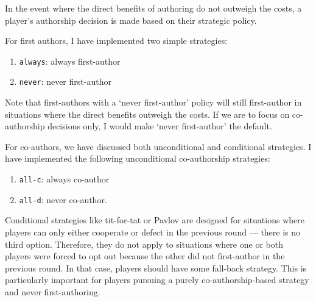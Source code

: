 \documentclass[12pt]{article}
\begin{document}
In the event where the direct benefits of authoring do not outweigh the costs,
a player's authorship decision is made based on their strategic policy.

For first authors, 
I have implemented two simple strategies:
\begin{enumerate}
    \item {\tt always}: always first-author
    \item {\tt never}: never first-author
\end{enumerate}
Note that first-authors with a `never first-author' policy will 
still first-author in situations where the direct benefits outweigh the costs.
If we are to focus on co-authorship decisions only,
I would make `never first-author' the default.

For co-authors,
we have discussed both unconditional and conditional strategies.
I have implemented the following unconditional co-authorship strategies:
\begin{enumerate}
    \item {\tt all-c}: always co-author
    \item {\tt all-d}: never co-author.
\end{enumerate}

Conditional strategies like tit-for-tat or Pavlov are designed for situations
where players can only either cooperate or defect in the previous round 
--- there is no third option.
Therefore,
they do not apply to situations where 
one or both players were forced to opt out because the other did not first-author
in the previous round.
In that case,
players should have some fall-back strategy.
This is particularly important for players pursuing a purely co-authorship-based 
strategy and never first-authoring.
\end{document}
